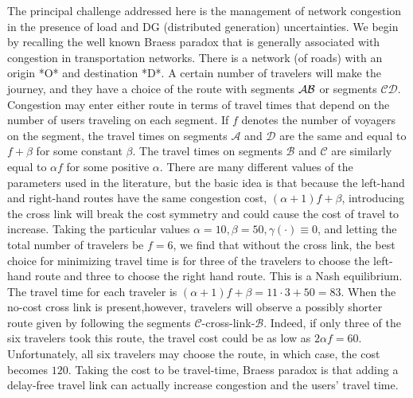 The principal challenge addressed here is the management of network congestion in the presence of load and DG (distributed generation) uncertainties. We begin by recalling the well known Braess paradox that is generally associated with congestion in transportation networks. There is a network (of roads) with an origin *O* and destination *D*. A certain number of travelers will make the journey, and they have a choice of the route with segments $\Large\mathcal{AB}$ or segments $\mathcal{CD}$. Congestion may enter either route in terms of travel times that depend on the number of users traveling on each segment. If $f$ denotes the number of voyagers on the segment, the travel times on segments ${\mathcal A}$ and ${\mathcal D}$ are the same and equal to $f+\beta$ for some constant $\beta$. The travel times on segments ${\mathcal B}$ and ${\mathcal C}$ are similarly equal to $\alpha f$ for some positive $\alpha$. There are many different values of the parameters used in the literature, but the basic idea is that because the left-hand and right-hand routes have the same congestion cost, $(\alpha+1)f+\beta$, introducing the cross link will break the cost symmetry and could cause the cost of travel to increase. Taking the particular values $\alpha=10,\beta=50,\gamma(\cdot)\equiv 0$, and letting the total number of travelers be $f=6$, we find that without the cross link, the best choice for minimizing travel time is for three of the travelers to choose the left-hand route and three to choose the right hand route. This is a Nash equilibrium. The travel time for each traveler is $(\alpha + 1)f+\beta= 11\cdot 3+50=83$. When the no-cost cross link is present,however, travelers will observe a possibly shorter route given by following the segments ${\mathcal C}$-cross-link-${\mathcal B}$. Indeed, if only three of the six travelers took this route, the travel cost could be as low as $2\alpha f=60$. Unfortunately, all six travelers may choose the route, in which case, the cost becomes $120$. Taking the cost to be travel-time, Braess paradox is that adding a delay-free travel link can actually increase congestion and the users' travel time.

